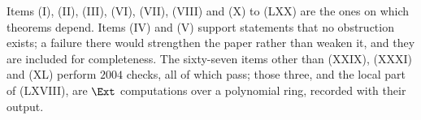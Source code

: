 Items (I), (II), (III), (VI), (VII), (VIII) and (X) to (LXX) are the ones
on which theorems depend. Items (IV) and (V) support statements that no
obstruction exists; a failure there would strengthen the paper rather than
weaken it, and they are included for completeness.
The sixty-seven items other than (XXIX), (XXXI) and (XL) perform $2004$
checks, all of which pass; those three, and the local part of (LXVIII), are
$\Ext$ computations over a polynomial ring, recorded with their output.
